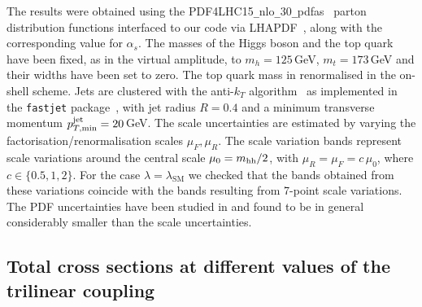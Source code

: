 
The results were obtained using the
PDF4LHC15{\tt\_}nlo{\tt\_}30{\tt\_}pdfas~\cite{Butterworth:2015oua,CT14,MMHT14,NNPDF}
parton distribution functions interfaced to our code via
LHAPDF~\cite{Buckley:2014ana}, along with the corresponding value for
$\alpha_s$.  The masses of the Higgs boson and the top quark have been
fixed, as in the virtual amplitude, to $m_h=125$\,GeV, $m_t=173$\,GeV and their widths have been set to zero.
The top quark mass in renormalised in the on-shell scheme.
Jets are clustered with the
anti-$k_T$ algorithm~\cite{Cacciari:2008gp} as implemented in the
{\tt fastjet} package~\cite{Cacciari:2005hq, Cacciari:2011ma}, with jet
radius $R=0.4$ and a minimum transverse momentum 
$p_{T,\mathrm{min}}^{\rm{jet}}=20$\,GeV.  The scale uncertainties are
estimated by varying the factorisation/renormalisation scales
$\mu_{F}, \mu_{R}$. The scale variation bands 
represent scale variations around the central scale $\mu_0 =m_{\mathrm{hh}}/2$, with
$\mu_{R} = \mu_{F}=c\,\mu_0$, where $c \in \{0.5,1,2\}$.
For the case $\lambda=\lambda_{\mathrm{SM}}$ we checked that the bands
obtained from these variations coincide with the bands resulting from
7-point scale variations. The PDF uncertainties have been studied in
\cite{deFlorian:2016spz} and found to be in general considerably smaller than the scale uncertainties.

\subsection{Total cross sections at different values of the trilinear coupling}

